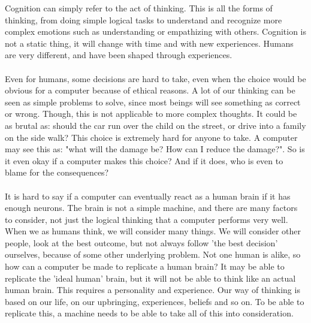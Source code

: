 \documentclass{article}
\begin{document}
\noindent
Cognition can simply refer to the act of thinking. This is all the forms of thinking, from doing simple logical tasks to understand and recognize more complex emotions such as understanding or empathizing  with others. Cognition is not a static thing, it will change with time and with new experiences. Humans are very different, and have been shaped through experiences.
\\ \\
Even for humans, some decisions are hard to take, even when the choice would be obvious for a computer because of ethical reasons. A lot of our thinking can be seen as simple problems to solve, since most beings will see something as correct or wrong. Though, this is not applicable to more complex thoughts. It could be as  brutal as: should the car run over the child on the street, or drive into a family on the side walk? This choice is extremely hard for anyone to take. A computer may see this as: "what will the damage  be? How can I reduce the damage?". So is it even okay if a computer makes this choice? And if it does, who is even to blame for the consequences?
\\ \\
It is hard to say if a computer can eventually react as a human brain if it has enough neurons. The brain is not a simple machine, and there are many factors to consider, not just the logical thinking that a computer performs very well. When we as humans think, we will consider many things. We will consider other people, look at the best outcome, but not always follow 'the best decision' ourselves, because of some other underlying problem. Not one human is alike, so how can a computer be made to replicate a human brain? It may be able to replicate the 'ideal human' brain, but it will not be able to think like an actual human brain. This requires a personality and experience. Our way of thinking is based on our life, on our upbringing, experiences, beliefs and so on. To be able to replicate this, a machine needs to be able to take all of this into consideration.


\end{document}
